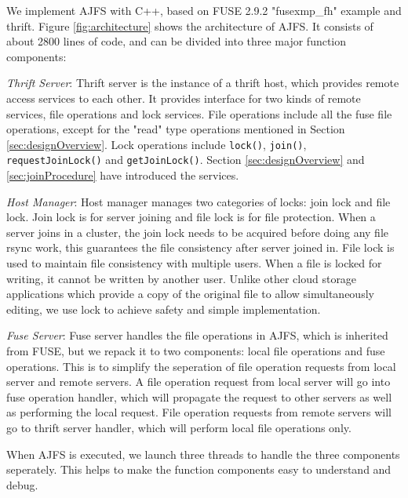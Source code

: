 We implement AJFS with C++, based on FUSE 2.9.2 "fusexmp\_fh" example and thrift. Figure \ref{fig:architecture} shows the architecture of AJFS. It consists of about 2800 lines of code, and can be divided into three major function components:

\emph{Thrift Server}: Thrift server is the instance of a thrift host, which provides remote access services to each other. It provides interface for two kinds of remote services, file operations and lock services. File operations include all the fuse file operations, except for the "read" type operations mentioned in Section \ref{sec:designOverview}. Lock operations include \texttt{lock()}, \texttt{join()}, \texttt{requestJoinLock()} and \texttt{getJoinLock()}. Section \ref{sec:designOverview} and \ref{sec:joinProcedure} have introduced the services.

\emph{Host Manager}: Host manager manages two categories of locks: join lock and file lock. Join lock is for server joining and file lock is for file protection. When a server joins in a cluster, the join lock needs to be acquired before doing any file rsync work, this guarantees the file consistency after server joined in. File lock is used to maintain file consistency with multiple users. When a file is locked for writing, it cannot be written by another user. Unlike other cloud storage applications which provide a copy of the original file to allow simultaneously editing, we use lock to achieve safety and simple implementation.

\emph{Fuse Server}: Fuse server handles the file operations in AJFS, which is inherited from FUSE, but we repack it to two components: local file operations and fuse operations. This is to simplify the seperation of file operation requests from local server and remote servers. A file operation request from local server will go into fuse operation handler, which will propagate the request to other servers as well as performing the local request. File operation requests from remote servers will go to thrift server handler, which will perform local file operations only.

When AJFS is executed, we launch three threads to handle the three components seperately. This helps to make the function components easy to understand and debug.
